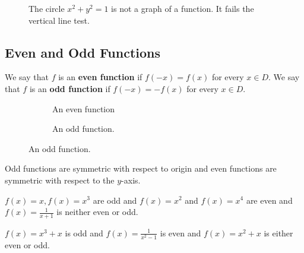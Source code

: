\documentclass[calc1-main.tex]{subfiles}
\begin{document}
\begin{figure}[H]
  \centering
  
  \caption{The circle $x^2+y^2=1$ is not a graph of a function. It fails the vertical line test.}
\end{figure}

\subsection*{Even and Odd Functions}

\begin{definition}
  We say that $f$ is an \textbf{even function} if $f\left( -x\right) =f\left( x\right) $ for every $x\in D$.
  We say that $f$ is an \textbf{odd function} if $f(-x)=-f(x)$ for every $x\in D$.
\end{definition}

\begin{figure}[H]
  \centering
  \begin{subfigure}{0.3\textwidth}
    
    \caption{An even function}
  \end{subfigure}
  \begin{subfigure}{0.3\textwidth}
    
    \caption{An odd function.}
  \end{subfigure}
\end{figure}

Odd functions are symmetric with respect to origin and even functions are symmetric with respect to the $y$-axis.


\begin{example}
  $f(x)=x,f(x)=x^{3}$ are odd and $f(x)=x^{2}$ and $f(x) =x^{4}$ are even and $f(x)=\frac{1}{x+1}$ is neither even or odd.
\end{example}

\begin{example}
  $f(x)=x^{3}+x$ is odd and $f(x)=\frac{1}{x^{2}-1}$ is even and $f(x)=x^{2}+x$
  is either even or odd.
\end{example}
\end{document}
